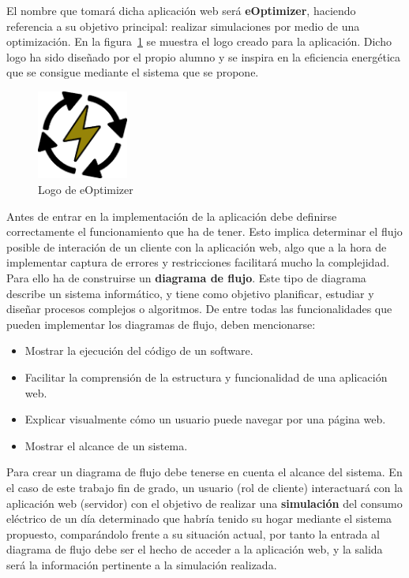 El nombre que tomará dicha aplicación web será \textbf{eOptimizer}, haciendo referencia a su objetivo principal: realizar simulaciones por medio de una optimización. En la figura~\ref{fig:logo} se muestra el logo creado para la aplicación. Dicho logo ha sido diseñado por el propio alumno y se inspira en la eficiencia energética que se consigue mediante el sistema que se propone.
\begin{figure}[!h]
            \centering
            \includegraphics[width=3cm]{figs/logo.png}
            \caption{Logo de eOptimizer}
            \label{fig:logo}
\end{figure}

Antes de entrar en la implementación de la aplicación debe definirse correctamente el funcionamiento que ha de tener. Esto implica determinar el flujo posible de interación de un cliente con la aplicación web, algo que a la hora de implementar captura de errores y restricciones facilitará mucho la complejidad. Para ello ha de construirse un \textbf{diagrama de flujo}. Este tipo de diagrama describe un sistema informático, y tiene como objetivo planificar, estudiar y diseñar procesos complejos o algoritmos. De entre todas las funcionalidades que pueden implementar los diagramas de flujo, deben mencionarse:
\begin{itemize}
\item Mostrar la ejecución del código de un software.
\item Facilitar la comprensión de la estructura y funcionalidad de una aplicación web.
\item Explicar visualmente cómo un usuario puede navegar por una página web.
\item Mostrar el alcance de un sistema.
\end{itemize}
Para crear un diagrama de flujo debe tenerse en cuenta el alcance del sistema. En el caso de este trabajo fin de grado, un usuario (rol de cliente) interactuará con la aplicación web (servidor) con el objetivo de realizar una \textbf{simulación} del consumo eléctrico de un día determinado que habría tenido su hogar mediante el sistema propuesto, comparándolo frente a su situación actual, por tanto la entrada al diagrama de flujo debe ser el hecho de acceder a la aplicación web, y la salida será la información pertinente a la simulación realizada.\\

